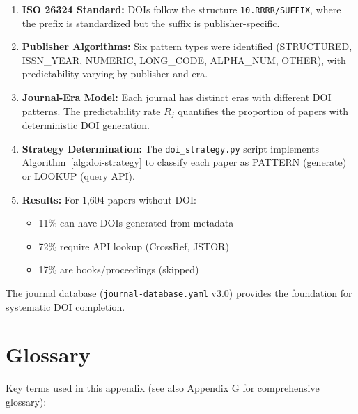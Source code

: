 \begin{enumerate}
    \item \textbf{ISO 26324 Standard:} DOIs follow the structure \texttt{10.RRRR/SUFFIX}, where the prefix is standardized but the suffix is publisher-specific.

    \item \textbf{Publisher Algorithms:} Six pattern types were identified (STRUCTURED, ISSN\_YEAR, NUMERIC, LONG\_CODE, ALPHA\_NUM, OTHER), with predictability varying by publisher and era.

    \item \textbf{Journal-Era Model:} Each journal has distinct eras with different DOI patterns. The predictability rate $R_j$ quantifies the proportion of papers with deterministic DOI generation.

    \item \textbf{Strategy Determination:} The \texttt{doi\_strategy.py} script implements Algorithm~\ref{alg:doi-strategy} to classify each paper as PATTERN (generate) or LOOKUP (query API).

    \item \textbf{Results:} For 1,604 papers without DOI:
    \begin{itemize}
        \item 11\% can have DOIs generated from metadata
        \item 72\% require API lookup (CrossRef, JSTOR)
        \item 17\% are books/proceedings (skipped)
    \end{itemize}
\end{enumerate}

The journal database (\texttt{journal-database.yaml} v3.0) provides the foundation for systematic DOI completion.

\section{Glossary}
\label{sec:glossary}

Key terms used in this appendix (see also Appendix G for comprehensive glossary):

